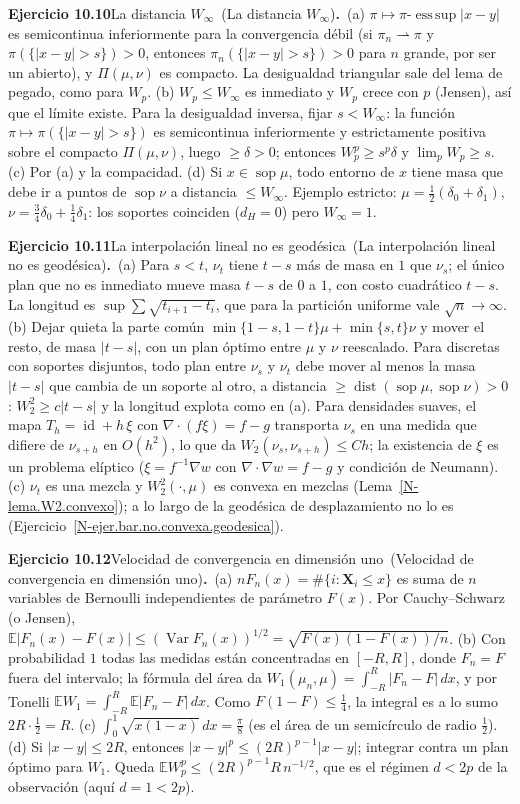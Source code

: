\documentclass[11pt,a4paper]{amsart}
\newcommand{\id}{\operatorname{id}}
\def\sop{\operatorname {\mathrm{sop}}}
\newcommand{\E}{{\mathbb E}}
\theoremstyle{remark}
\theoremstyle{definition}
\numberwithin{subsection}{section}
\numberwithin{equation}{section}
\newcommand{\ejlabel}[2]{\par\medskip\noindent\textbf{Ejercicio #1}\ifx\relax#2\relax\else\ (#2)\fi\textbf{.}\ }
\begin{document}
\ejlabel{10.10}{La distancia $W_\infty$}(a) $\pi\mapsto\pi$-$\operatorname{ess\,sup}|x-y|$ es semicontinua inferiormente para la convergencia débil (si $\pi_n\rightharpoonup\pi$ y $\pi(\{|x-y|>s\})>0$, entonces $\pi_n(\{|x-y|>s\})>0$ para $n$ grande, por ser un abierto), y $\Pi(\mu,\nu)$ es compacto. La desigualdad triangular sale del lema de pegado, como para $W_p$. (b) $W_p\le W_\infty$ es inmediato y $W_p$ crece con $p$ (Jensen), así que el límite existe. Para la desigualdad inversa, fijar $s<W_\infty$: la función $\pi\mapsto\pi(\{|x-y|>s\})$ es semicontinua inferiormente y estrictamente positiva sobre el compacto $\Pi(\mu,\nu)$, luego $\ge\delta>0$; entonces $W_p^p\ge s^p\delta$ y $\lim_pW_p\ge s$. (c) Por (a) y la compacidad. (d) Si $x\in\sop\mu$, todo entorno de $x$ tiene masa que debe ir a puntos de $\sop\nu$ a distancia $\le W_\infty$. Ejemplo estricto: $\mu=\frac12(\delta_0+\delta_1)$, $\nu=\frac34\delta_0+\frac14\delta_1$: los soportes coinciden ($d_H=0$) pero $W_\infty=1$.

\ejlabel{10.11}{La interpolación lineal no es geodésica}(a) Para $s<t$, $\nu_t$ tiene $t-s$ más de masa en $1$ que $\nu_s$; el único plan que no es inmediato mueve masa $t-s$ de $0$ a $1$, con costo cuadrático $t-s$. La longitud es $\sup\sum\sqrt{t_{i+1}-t_i}$, que para la partición uniforme vale $\sqrt n\to\infty$. (b) Dejar quieta la parte común $\min\{1-s,1-t\}\mu+\min\{s,t\}\nu$ y mover el resto, de masa $|t-s|$, con un plan óptimo entre $\mu$ y $\nu$ reescalado. Para discretas con soportes disjuntos, todo plan entre $\nu_s$ y $\nu_t$ debe mover al menos la masa $|t-s|$ que cambia de un soporte al otro, a distancia $\ge\operatorname{dist}(\sop\mu,\sop\nu)>0$: $W_2^2\ge c|t-s|$ y la longitud explota como en (a). Para densidades suaves, el mapa $T_h=\id+h\,\xi$ con $\nabla\cdot(f\xi)=f-g$ transporta $\nu_s$ en una medida que difiere de $\nu_{s+h}$ en $O(h^2)$, lo que da $W_2(\nu_s,\nu_{s+h})\le Ch$; la existencia de $\xi$ es un problema elíptico ($\xi=f^{-1}\nabla w$ con $\nabla\cdot\nabla w=f-g$ y condición de Neumann). (c) $\nu_t$ es una mezcla y $W_2^2(\cdot,\mu)$ es convexa en mezclas (Lema~\ref{N-lema.W2.convexo}); a lo largo de la geodésica de desplazamiento no lo es (Ejercicio~\ref{N-ejer.bar.no.convexa.geodesica}).

\ejlabel{10.12}{Velocidad de convergencia en dimensión uno}(a) $nF_n(x)=\#\{i:\mathbf X_i\le x\}$ es suma de $n$ variables de Bernoulli independientes de parámetro $F(x)$. Por Cauchy--Schwarz (o Jensen), $\E|F_n(x)-F(x)|\le(\operatorname{Var}F_n(x))^{1/2}=\sqrt{F(x)(1-F(x))/n}$. (b) Con probabilidad $1$ todas las medidas están concentradas en $[-R,R]$, donde $F_n=F$ fuera del intervalo; la fórmula del área da $W_1(\mu_n,\mu)=\int_{-R}^R|F_n-F|\,dx$, y por Tonelli $\E W_1=\int_{-R}^R\E|F_n-F|\,dx$. Como $F(1-F)\le\frac14$, la integral es a lo sumo $2R\cdot\frac12=R$. (c) $\int_0^1\sqrt{x(1-x)}\,dx=\frac\pi8$ (es el área de un semicírculo de radio $\frac12$). (d) Si $|x-y|\le2R$, entonces $|x-y|^p\le(2R)^{p-1}|x-y|$; integrar contra un plan óptimo para $W_1$. Queda $\E W_p^p\le(2R)^{p-1}R\,n^{-1/2}$, que es el régimen $d<2p$ de la observación (aquí $d=1<2p$).
\end{document}
